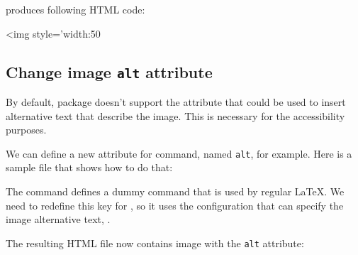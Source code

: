 produces following HTML code:

\begin{htmlsource}
<img style='width:50%
\end{htmlsource}


\subsection{Change image \texttt{alt} attribute}

By default,  package doesn't support the attribute that could
be used to insert alternative text that describe the image. This is necessary
for the accessibility purposes.

We can define a new attribute for  command, named
\texttt{alt}, for example. Here is a sample file that shows how to do that:


The  command defines a dummy command that
is used by regular \LaTeX. We need to redefine this key for \texfourht, so it uses the
configuration that can specify the image alternative text, .


The resulting HTML file now contains image with the \texttt{alt} attribute:

